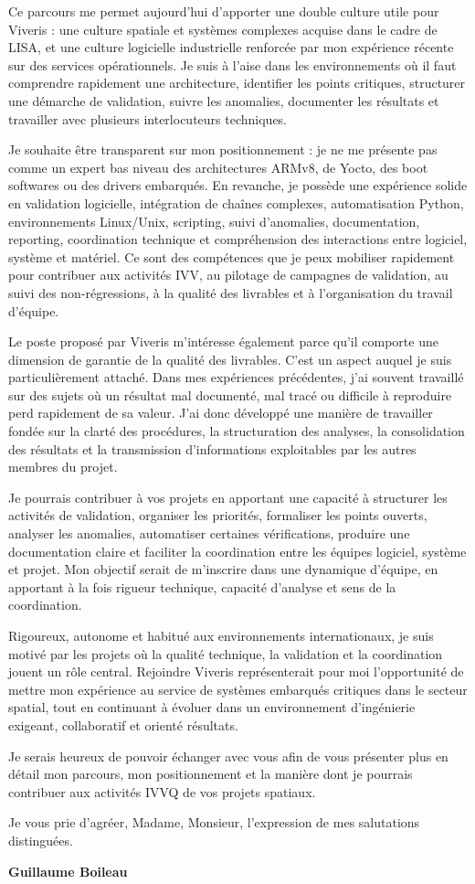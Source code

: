\documentclass[11pt,a4paper]{altacv}
\begin{document}
{Ce parcours me permet aujourd'hui d'apporter une double culture utile pour Viveris : une culture spatiale et systèmes complexes acquise dans le cadre de LISA, et une culture logicielle industrielle renforcée par mon expérience récente sur des services opérationnels. Je suis à l'aise dans les environnements où il faut comprendre rapidement une architecture, identifier les points critiques, structurer une démarche de validation, suivre les anomalies, documenter les résultats et travailler avec plusieurs interlocuteurs techniques.

Je souhaite être transparent sur mon positionnement : je ne me présente pas comme un expert bas niveau des architectures ARMv8, de Yocto, des boot softwares ou des drivers embarqués. En revanche, je possède une expérience solide en validation logicielle, intégration de chaînes complexes, automatisation Python, environnements Linux/Unix, scripting, suivi d'anomalies, documentation, reporting, coordination technique et compréhension des interactions entre logiciel, système et matériel. Ce sont des compétences que je peux mobiliser rapidement pour contribuer aux activités IVV, au pilotage de campagnes de validation, au suivi des non-régressions, à la qualité des livrables et à l'organisation du travail d'équipe.

Le poste proposé par Viveris m'intéresse également parce qu'il comporte une dimension de garantie de la qualité des livrables. C'est un aspect auquel je suis particulièrement attaché. Dans mes expériences précédentes, j'ai souvent travaillé sur des sujets où un résultat mal documenté, mal tracé ou difficile à reproduire perd rapidement de sa valeur. J'ai donc développé une manière de travailler fondée sur la clarté des procédures, la structuration des analyses, la consolidation des résultats et la transmission d'informations exploitables par les autres membres du projet.

Je pourrais contribuer à vos projets en apportant une capacité à structurer les activités de validation, organiser les priorités, formaliser les points ouverts, analyser les anomalies, automatiser certaines vérifications, produire une documentation claire et faciliter la coordination entre les équipes logiciel, système et projet. Mon objectif serait de m'inscrire dans une dynamique d'équipe, en apportant à la fois rigueur technique, capacité d'analyse et sens de la coordination.

Rigoureux, autonome et habitué aux environnements internationaux, je suis motivé par les projets où la qualité technique, la validation et la coordination jouent un rôle central. Rejoindre Viveris représenterait pour moi l'opportunité de mettre mon expérience au service de systèmes embarqués critiques dans le secteur spatial, tout en continuant à évoluer dans un environnement d'ingénierie exigeant, collaboratif et orienté résultats.

Je serais heureux de pouvoir échanger avec vous afin de vous présenter plus en détail mon parcours, mon positionnement et la manière dont je pourrais contribuer aux activités IVVQ de vos projets spatiaux.

Je vous prie d'agréer, Madame, Monsieur, l'expression de mes salutations distinguées.

\textbf{Guillaume Boileau}

}
\end{document}
